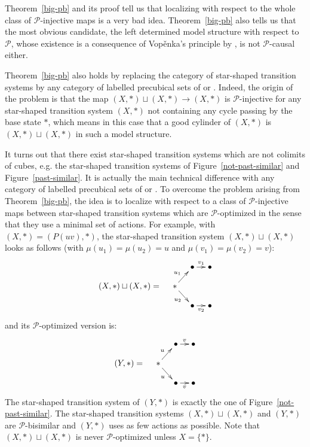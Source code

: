 \documentclass[a4paper,12pt]{amsart}
\begin{document}
Theorem~\ref{big-pb} and its proof tell us that localizing with
respect to the whole class of $\mathcal{P}$-injective maps is a very
bad idea. Theorem~\ref{big-pb} also tells us that the most obvious
candidate, the left determined model structure with respect to
$\mathcal{P}$, whose existence is a consequence of Vop\v{e}nka's
principle by \cite[Theorem~2.2]{rotho}, is not $\mathcal{P}$-causal
either. 

Theorem~\ref{big-pb} also holds by replacing the category of
star-shaped transition systems by any category of labelled precubical
sets of \cite{ccsprecub} or \cite{symcub}.  Indeed, the origin of the
problem is that the map $(X,*)\sqcup (X,*)\to (X,*)$ is
$\mathcal{P}$-injective for any star-shaped transition system $(X,*)$
not containing any cycle passing by the base state $*$, which means in
this case that a good cylinder of $(X,*)$ is $(X,*)\sqcup (X,*)$ in
such a model structure.

It turns out that there exist star-shaped transition systems which are
not colimits of cubes, e.g. the star-shaped transition systems of
Figure~\ref{not-past-similar} and Figure~\ref{past-similar}. It is
actually the main technical difference with any category of labelled
precubical sets of \cite{ccsprecub} or \cite{symcub}. To overcome the
problem arising from Theorem~\ref{big-pb}, the idea is to localize
with respect to a class of $\mathcal{P}$-injective maps between
star-shaped transition systems which are $\mathcal{P}$-optimized in
the sense that they use a minimal set of actions. For example, with
$(X,*)=(P(uv),*)$, the star-shaped transition system $(X,*)\sqcup
(X,*)$ looks as follows (with $\mu(u_1)=\mu(u_2)=u$ and
$\mu(v_1)=\mu(v_2)=v$):
\[
\xymatrix@C=1em@R=1em
{
&& \bullet {\ar@{->}[r]^-{{v_1}}} & \bullet  \\
(X,*)\sqcup (X,*) = & {*} \ar@{->}[ru]^-{u_1}\ar@{->}[rd]_-{u_2} \\
&& \bullet \ar@{->}[r]_-{v_2}&\bullet\\
}
\]
and its $\mathcal{P}$-optimized version is:
\[
\xymatrix@C=1em@R=1em
{
&& \bullet {\ar@{->}[r]^-{{v}}} & \bullet  \\
(Y,*) = & {*} \ar@{->}[ru]^-{u}\ar@{->}[rd]_-{u} \\
&& \bullet \ar@{->}[r]_-{v}&\bullet\\
}
\]
The star-shaped transition system of $(Y,*)$ is exactly the one of
Figure~\ref{not-past-similar}.  The star-shaped transition systems
$(X,*)\sqcup (X,*)$ and $(Y,*)$ are $\mathcal{P}$-bisimilar and
$(Y,*)$ uses as few actions as possible.  Note that $(X,*)\sqcup
(X,*)$ is never $\mathcal{P}$-optimized unless $X=\{*\}$.
\end{document}
